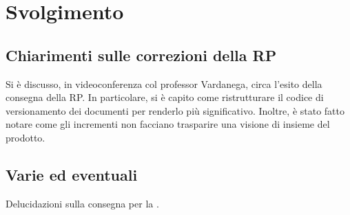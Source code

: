 \newpage
\section*{Svolgimento}

	\subsection*{Chiarimenti sulle correzioni della RP}
		Si è discusso, in videoconferenza col professor Vardanega, circa l'esito della consegna della RP. In particolare, si è capito come ristrutturare il codice di versionamento dei documenti per renderlo più significativo.
		Inoltre, è stato fatto notare come gli incrementi non facciano trasparire una visione di insieme del prodotto.

	\subsection*{Varie ed eventuali}
		Delucidazioni sulla consegna per la .
